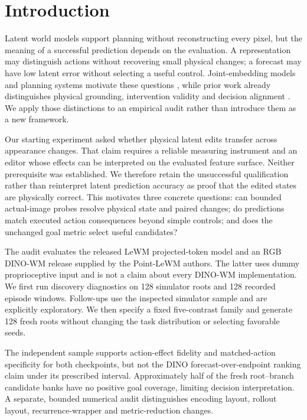 \section{Introduction}
\label{sec:intro}

Latent world models support planning without reconstructing every pixel, but the
meaning of a successful prediction depends on the evaluation. A representation
may distinguish actions without recovering small physical changes; a forecast
may have low latent error without selecting a useful control. Joint-embedding
models and planning systems motivate these questions
\citep{maes2026lewm,zhou2025dinowm}, while prior work already distinguishes
physical grounding, intervention validity and decision alignment
\citep{vakalis2026interventiongap,subramanian2026counterfactual,liu2026djepa}.
We apply those distinctions to an empirical audit rather than introduce them as
a new framework.

Our starting experiment asked whether physical latent edits transfer across
appearance changes. That claim requires a reliable measuring instrument and an
editor whose effects can be interpreted on the evaluated feature surface.
Neither prerequisite was established. We therefore retain the unsuccessful
qualification rather than reinterpret latent prediction accuracy as proof that
the edited states are physically correct. This motivates three concrete
questions: can bounded actual-image probes resolve physical state and paired
changes; do predictions match executed action consequences beyond simple
controls; and does the unchanged goal metric select useful candidates?

The audit evaluates the released LeWM projected-token model and an RGB
DINO-WM release supplied by the Point-LeWM authors. The latter uses dummy
proprioceptive input and is not a claim about every DINO-WM implementation.
We first run discovery diagnostics on 128 simulator roots and 128 recorded
episode windows. Follow-ups use the inspected simulator sample and are explicitly
exploratory. We then specify a fixed five-contrast family and generate 128 fresh
roots without changing the task distribution or selecting favorable seeds.

The independent sample supports action-effect fidelity and matched-action
specificity for both checkpoints, but not the DINO forecast-over-endpoint ranking
claim under its prescribed interval. Approximately half of the fresh
root--branch candidate banks have no positive goal coverage, limiting decision
interpretation. A separate, bounded numerical audit distinguishes encoding
layout, rollout layout, recurrence-wrapper and metric-reduction changes.

